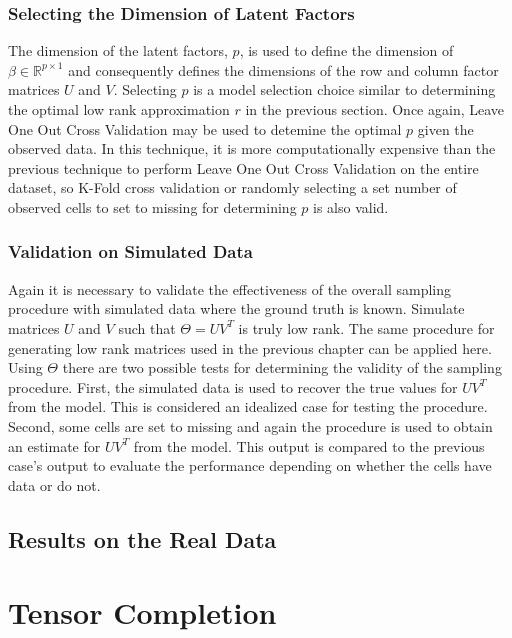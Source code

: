 \documentclass[12pt,twoside]{dukestatscithesis}
\theoremstyle{definition}
\theoremstyle{definition}
\theoremstyle{definition}
\theoremstyle{remark}
\begin{document}
\subsection{Selecting the Dimension of Latent
Factors}\label{selecting-the-dimension-of-latent-factors}

The dimension of the latent factors, \(p\), is used to define the
dimension of \(\beta \in \mathbb{R}^{p \times 1}\) and consequently
defines the dimensions of the row and column factor matrices \(U\) and
\(V\). Selecting \(p\) is a model selection choice similar to
determining the optimal low rank approximation \(r\) in the previous
section. Once again, Leave One Out Cross Validation may be used to
detemine the optimal \(p\) given the observed data. In this technique,
it is more computationally expensive than the previous technique to
perform Leave One Out Cross Validation on the entire dataset, so K-Fold
cross validation or randomly selecting a set number of observed cells to
set to missing for determining \(p\) is also valid.

\subsection{Validation on Simulated
Data}\label{validation-on-simulated-data}

Again it is necessary to validate the effectiveness of the overall
sampling procedure with simulated data where the ground truth is known.
Simulate matrices \(U\) and \(V\) such that \(\Theta = UV^T\) is truly
low rank. The same procedure for generating low rank matrices used in
the previous chapter can be applied here. Using \(\Theta\) there are two
possible tests for determining the validity of the sampling procedure.
First, the simulated data is used to recover the true values for
\(UV^T\) from the model. This is considered an idealized case for
testing the procedure. Second, some cells are set to missing and again
the procedure is used to obtain an estimate for \(UV^T\) from the model.
This output is compared to the previous case's output to evaluate the
performance depending on whether the cells have data or do not.

\section{Results on the Real Data}\label{results-on-the-real-data}

\chapter{Tensor Completion}\label{tensor-completion}
\end{document}
